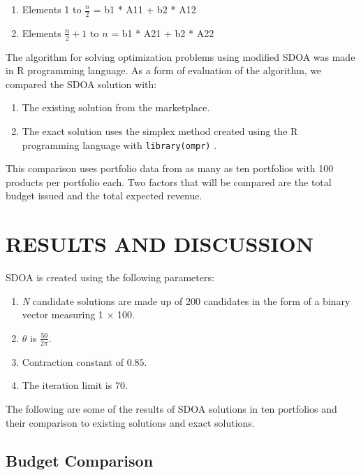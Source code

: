 \documentclass[preprint, 3p,
authoryear]{elsarticle} %
\providecommand{\tightlist}{%
  \setlength{\itemsep}{0pt}\setlength{\parskip}{0pt}}
\begin{document}
\begin{enumerate}
\def\labelenumi{\arabic{enumi}.}
\tightlist
\item
  Elements 1 to \(\frac{n}{2}\) = b1 * A11 + b2 * A12
\item
  Elements \(\frac{n}{2} + 1\) to \(n\) = b1 * A21 + b2 * A22
\end{enumerate}

The algorithm for solving optimization problems using modified SDOA was
made in R programming language. As a form of evaluation of the
algorithm, we compared the SDOA solution with:

\begin{enumerate}
\def\labelenumi{\arabic{enumi}.}
\tightlist
\item
  The existing solution from the marketplace.
\item
  The exact solution uses the simplex method created using the R
  programming language with \texttt{library(ompr)} \citep{ompr}.
\end{enumerate}

This comparison uses portfolio data from as many as ten portfolios with
100 products per portfolio each. Two factors that will be compared are
the total budget issued and the total expected revenue.

\hypertarget{results-and-discussion}{%
\section{RESULTS AND DISCUSSION}\label{results-and-discussion}}

SDOA is created using the following parameters:

\begin{enumerate}
\def\labelenumi{\arabic{enumi}.}
\tightlist
\item
  \emph{N} candidate solutions are made up of 200 candidates in the form
  of a binary vector measuring 1 \(\times\) 100.
\item
  \(\theta\) is \(\frac{50}{2 \pi}\).
\item
  Contraction constant of \(0.85\).
\item
  The iteration limit is \(70\).
\end{enumerate}

The following are some of the results of SDOA solutions in ten
portfolios and their comparison to existing solutions and exact
solutions.

\hypertarget{budget-comparison}{%
\subsection{Budget Comparison}\label{budget-comparison}}
\end{document}
